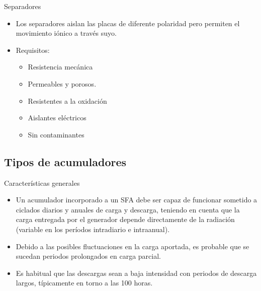\documentclass[xcolor={usenames,svgnames,dvipsnames}]{beamer}
\begin{document}
\begin{frame}[label={sec:org6aada3d}]{Separadores}
\begin{itemize}
\item Los separadores \alert{aislan las placas de diferente polaridad pero
permiten el movimiento iónico a través suyo}.
\item Requisitos:
\begin{itemize}
\item Resistencia mecánica
\item Permeables y porosos.
\item Resistentes a la oxidación
\item Aislantes eléctricos
\item Sin contaminantes
\end{itemize}
\end{itemize}
\end{frame}

\subsection{Tipos de acumuladores}
\label{sec:org74b34c7}

\begin{frame}[label={sec:orgd54c7ab}]{Características generales}
\begin{itemize}
\item Un acumulador incorporado a un SFA debe ser \alert{capaz de funcionar sometido a ciclados diarios y anuales de carga y descarga}, teniendo en cuenta que la carga entregada por el generador depende directamente de la radiación (variable en los períodos intradiario e intraanual).

\item Debido a las posibles fluctuaciones en la carga aportada, es probable que se sucedan \alert{periodos prolongados en carga parcial}.

\item Es habitual que las \alert{descargas sean a baja intensidad con periodos de descarga largos}, típicamente en torno a las 100 horas.
\end{itemize}
\end{frame}
\end{document}
